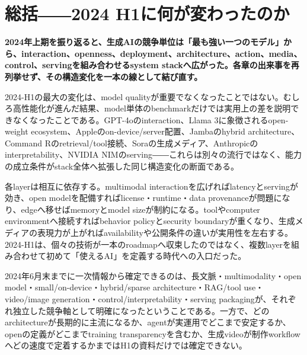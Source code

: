 \section{総括――2024 H1に何が変わったのか}
\label{pkg:conclusion}
\noindent\textbf{2024年上期を振り返ると、生成AIの競争単位は「最も強い一つのモデル」から、interaction、openness、deployment、architecture、action、media、control、servingを組み合わせるsystem stackへ広がった。各章の出来事を再列挙せず、その構造変化を一本の線として結び直す。}\autocite{src-054d1f81750b,src-0fe343211040,src-2d3a533e91db,src-4ff5ab7d45bc,src-77e35e5f22be,src-b5fbfc0d43e4,src-c89d38f0e830,src-f9616f30e8f5}

2024-H1の最大の変化は、model qualityが重要でなくなったことではない。むしろ高性能化が進んだ結果、model単体のbenchmarkだけでは実用上の差を説明できなくなったことである。GPT-4oのinteraction、Llama 3に象徴されるopen-weight ecosystem、Appleのon-device/server配置、Jambaのhybrid architecture、Command Rのretrieval/tool接続、Soraの生成メディア、Anthropicのinterpretability、NVIDIA NIMのserving――これらは別々の流行ではなく、能力の成立条件がstack全体へ拡張した同じ構造変化の断面である。\autocite{src-054d1f81750b,src-0fe343211040,src-2d3a533e91db,src-4ff5ab7d45bc,src-77e35e5f22be,src-b5fbfc0d43e4,src-c89d38f0e830,src-f9616f30e8f5}


各layerは相互に依存する。multimodal interactionを広げればlatencyとservingが効き、open modelを配備すればlicense・runtime・data provenanceが問題になり、edgeへ移せばmemoryとmodel sizeが制約になる。toolやcomputer environmentへ接続すればbehavior policyとsecurity boundaryが重くなり、生成メディアの表現力が上がればavailabilityや公開条件の違いが実用性を左右する。2024-H1は、個々の技術が一本のroadmapへ収束したのではなく、複数layerを組み合わせて初めて「使えるAI」を定義する時代への入口だった。\autocite{src-054d1f81750b,src-0fe343211040,src-2d3a533e91db,src-4ff5ab7d45bc,src-77e35e5f22be,src-c89d38f0e830,src-f9616f30e8f5}


2024年6月末までに一次情報から確定できるのは、長文脈・multimodality・open model・small/on-device・hybrid/sparse architecture・RAG/tool use・video/image generation・control/interpretability・serving packagingが、それぞれ独立した競争軸として明確になったということである。一方で、どのarchitectureが長期的に主流になるか、agentが実運用でどこまで安定するか、openの定義がどこまでtraining transparencyを含むか、生成videoが制作workflowへどの速度で定着するかまではH1の資料だけでは確定できない。\autocite{src-054d1f81750b,src-0fe343211040,src-2d3a533e91db,src-4ff5ab7d45bc,src-77e35e5f22be,src-b5fbfc0d43e4,src-c89d38f0e830,src-f9616f30e8f5}


